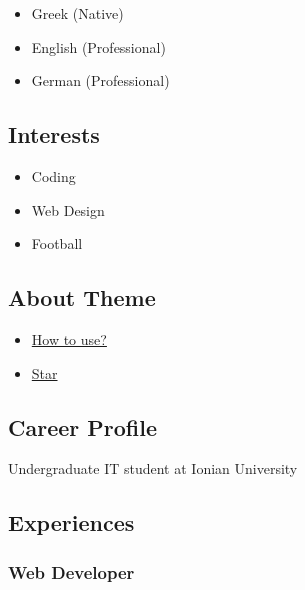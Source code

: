 \documentclass[
]{article}
\providecommand{\tightlist}{%
  \setlength{\itemsep}{0pt}\setlength{\parskip}{0pt}}
\begin{document}
\begin{itemize}
\tightlist
\item
  Greek {(Native)}
\item
  English {(Professional)}
\item
  German {(Professional)}
\end{itemize}

\hypertarget{interests}{%
\subsection{Interests}\label{interests}}

\begin{itemize}
\tightlist
\item
  Coding
\item
  Web Design
\item
  Football
\end{itemize}

\hypertarget{about-theme}{%
\subsection{About Theme}\label{about-theme}}

\begin{itemize}
\tightlist
\item
  \href{https://www.youtube.com/watch?v=Jnmj1dXDbNk}{How to use?}
\item
  \href{https://github.com/sharu725/online-cv}{Star}
\end{itemize}

\hypertarget{career-profile}{%
\subsection{\texorpdfstring{{ \emph{} \emph{} } Career
Profile}{    Career Profile}}\label{career-profile}}

Undergraduate IT student at Ionian University

\hypertarget{experiences}{%
\subsection{\texorpdfstring{{ \emph{} \emph{} }
Experiences}{    Experiences}}\label{experiences}}

\hypertarget{web-developer-1}{%
\subsubsection{Web Developer}\label{web-developer-1}}
\end{document}
